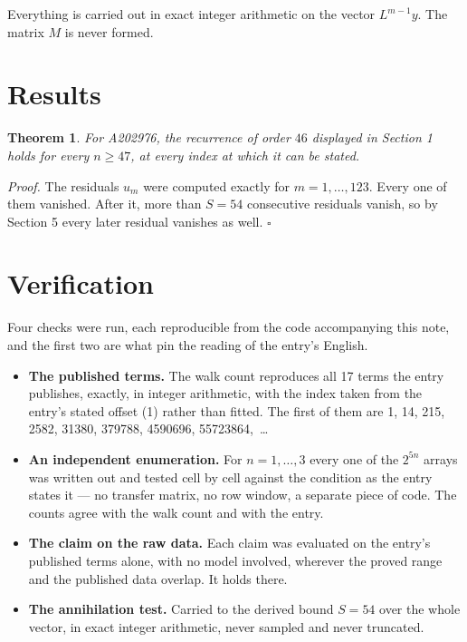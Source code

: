 \documentclass[11pt]{article}
\newtheorem{theorem}{Theorem}
\theoremstyle{definition}
\begin{document}
Everything is carried out in exact integer arithmetic on the vector $L^{m-1}y$. The matrix $M$ is never formed.

\section{Results}

\begin{theorem} For A202976, the recurrence of order $46$ displayed in Section 1 holds for every $n \ge 47$, at every index at which it can be stated.\end{theorem}

{\itshape Proof.} The residuals $u_m$ were computed exactly for $m = 1,\dots,123$. Every one of them vanished. After it, more than $S = 54$ consecutive residuals vanish, so by Section 5 every later residual vanishes as well. $\square$

\section{Verification}

Four checks were run, each reproducible from the code accompanying this note, and the first two are what pin the reading of the entry's English.

\begin{itemize}

\item {\bfseries The published terms.} The walk count reproduces all 17 terms the entry publishes, exactly, in integer arithmetic, with the index taken from the entry's stated offset (1) rather than fitted. The first of them are 1, 14, 215, 2582, 31380, 379788, 4590696, 55723864,~\dots

\item {\bfseries An independent enumeration.} For $n = 1,\dots,3$ every one of the $2^{5n}$ arrays was written out and tested cell by cell against the condition as the entry states it --- no transfer matrix, no row window, a separate piece of code. The counts agree with the walk count and with the entry.

\item {\bfseries The claim on the raw data.} Each claim was evaluated on the entry's published terms alone, with no model involved, wherever the proved range and the published data overlap. It holds there.

\item {\bfseries The annihilation test.} Carried to the derived bound $S = 54$ over the whole vector, in exact integer arithmetic, never sampled and never truncated.

\end{itemize}
\end{document}
